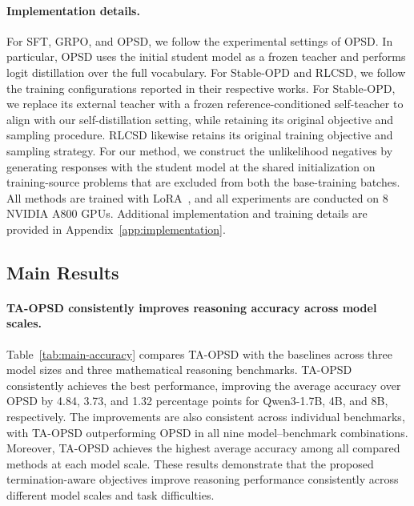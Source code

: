 \documentclass{article} %
\begin{document}
\paragraph{Implementation details.} For SFT, GRPO, and OPSD, we follow the experimental settings of OPSD. In particular, OPSD uses the initial student model as a frozen teacher and performs logit distillation over the full vocabulary. For Stable-OPD and RLCSD, we follow the training configurations reported in their respective works. For Stable-OPD, we replace its external teacher with a frozen reference-conditioned self-teacher to align with our self-distillation setting, while retaining its original objective and sampling procedure. RLCSD likewise retains its original training objective and sampling strategy. For our method, we construct the unlikelihood negatives by generating responses with the student model at the shared initialization on training-source problems that are excluded from both the base-training batches. All methods are trained with LoRA~\citep{hu2021loralowrankadaptationlarge}, and all experiments are conducted on 8 NVIDIA A800 GPUs. Additional implementation and training details are provided in Appendix~\ref{app:implementation}.


\subsection{Main Results}
\label{sec:main-results}

\paragraph{TA-OPSD consistently improves reasoning accuracy across model scales.} Table~\ref{tab:main-accuracy} compares TA-OPSD with the baselines across three model sizes and three mathematical reasoning benchmarks. TA-OPSD consistently achieves the best performance, improving the average accuracy over OPSD by 4.84, 3.73, and 1.32 percentage points for Qwen3-1.7B, 4B, and 8B, respectively. The improvements are also consistent across individual benchmarks, with TA-OPSD outperforming OPSD in all nine model--benchmark combinations. Moreover, TA-OPSD achieves the highest average accuracy among all compared methods at each model scale. These results demonstrate that the proposed termination-aware objectives improve reasoning performance consistently across different model scales and task difficulties.
\end{document}
